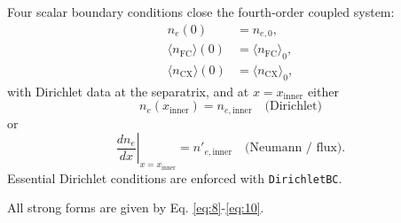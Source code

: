 \documentclass[twocolumn,secnumarabic,amssymb, nobibnotes, aps, prd]{revtex4-2}
\begin{document}
Four scalar boundary conditions close the fourth-order coupled system:
\begin{subequations}
\label{eq:bcs}
\begin{align}
  n_e(0) &= n_{e,0}, \label{eq:bc-ne0}\\
  \langle n_{\mathrm{FC}}\rangle(0) &= \langle n_{\mathrm{FC}}\rangle_{0}, \label{eq:bc-nfc0}\\
  \langle n_{\mathrm{CX}}\rangle(0) &= \langle n_{\mathrm{CX}}\rangle_{0}, \label{eq:bc-ncx0}
\end{align}
\end{subequations}
with Dirichlet data at the separatrix, and at $x=x_{\mathrm{inner}}$ either
\begin{equation}
  n_e(x_{\mathrm{inner}}) = n_{e,\mathrm{inner}}
  \quad\text{(Dirichlet)}
  \label{eq:bc-ne-dirichlet}
\end{equation}
or
\begin{equation}
  \left.\frac{dn_e}{dx}\right|_{x=x_{\mathrm{inner}}} = n'_{e,\mathrm{inner}}
  \quad\text{(Neumann / flux)}.
  \label{eq:bc-ne-neumann}
\end{equation}
Essential Dirichlet conditions are enforced with \texttt{DirichletBC}.

All strong forms are given by Eq. \ref{eq:8}-\ref{eq:10}. \\

\end{document}
